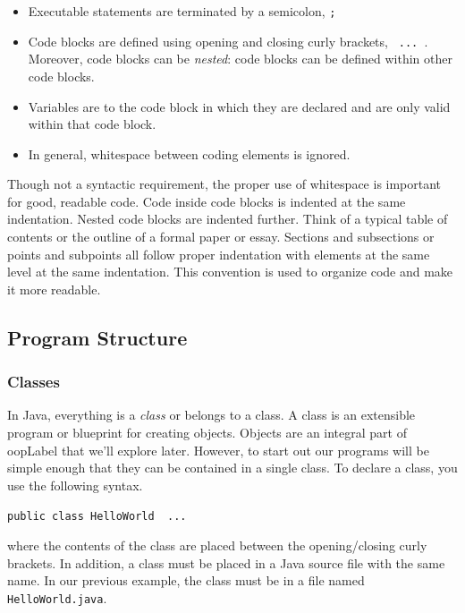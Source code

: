 \begin{itemize}
\begin{center}
	\end{center}
  \item Executable statements are terminated by a semicolon, \texttt{;}
  \item Code blocks are defined using opening and closing curly brackets, 
  	\texttt{{ ... }}.  Moreover, code blocks can be \emph{nested}: code
	blocks can be defined within other code blocks.  
  \item Variables are  to the code block in which they are declared
  	and are only valid within that code block.
  \item In general, whitespace between coding elements is ignored.
\end{itemize}

Though not a syntactic requirement, the proper use of whitespace is important for
good, readable code.  Code inside code blocks is indented at the same indentation.
Nested code blocks are indented further.  Think of a typical table of contents or
the outline of a formal paper or essay.  Sections and subsections or points and 
subpoints all follow proper indentation with elements at the same level at the same
indentation.  This convention is used to organize code and make it more readable.

\subsection{Program Structure}

\subsubsection{Classes}

In Java, everything is a \emph{class} or belongs to a class.  A class is an 
extensible program or blueprint for creating objects.  Objects are an integral
part of \gls{oopLabel} that we'll explore later.  However, to start out our
programs will be simple enough that they can be contained in a single class.
To declare a class, you use the following syntax.

\texttt{public class HelloWorld { ... }}

where the contents of the class are placed between the opening/closing curly
brackets.  In addition, a class must be placed in a Java source file with the same
name.  In our previous example, the class must be in a file named 
\texttt{HelloWorld.java}.  

